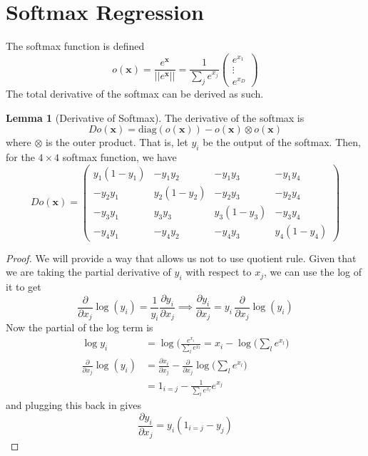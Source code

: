 \documentclass{article}
\theoremstyle{definition}
\newtheorem{lemma}[theorem]{Lemma}
\begin{document}
  \section{Softmax Regression}

  The softmax function is defined 
  \[o(\mathbf{x}) = \frac{e^{\mathbf{x}}}{||e^{\mathbf{x}}||} = \frac{1}{\sum_j e^{x_j}}\begin{pmatrix} e^{x_1} \\ \vdots \\ e^{x_D} \end{pmatrix}\]
  The total derivative of the softmax can be derived as such. 

  \begin{lemma}[Derivative of Softmax]
  The derivative of the softmax is 
  \[D o (\mathbf{x}) = \mathrm{diag}(o (\mathbf{x})) - o (\mathbf{x}) \otimes o (\mathbf{x})\]
  where $\otimes$ is the outer product. That is, let $y_i$ be the output of the softmax. Then, for the $4 \times 4$ softmax function, we have 
  \[D o(\mathbf{x}) = \begin{pmatrix} y_1 (1 - y_1) & - y_1 y_2 & -y_1 y_3 & - y_1 y_4 \\ -y_2 y_1 & y_2 (1 - y_2) & - y_2 y_3 & - y_2 y_4 \\ -y_3 y_1 & y_3 y_3 & y_3 (1 - y_3) & -y_3 y_4 \\ -y_4 y_1 & -y_4 y_2 & -y_4 y_3 & y_4 (1 - y_4) \end{pmatrix} \]
  \end{lemma}
  \begin{proof}
  We will provide a way that allows us not to use quotient rule. Given that we are taking the partial derivative of $y_i$ with respect to $x_j$, we can use the log of it to get 
  \[\frac{\partial}{\partial x_j} \log (y_i) = \frac{1}{y_i} \frac{\partial y_i}{\partial x_j} \implies \frac{\partial y_i}{\partial x_j} = y_i \, \frac{\partial}{\partial x_j} \log(y_i)\]
  Now the partial of the log term is 
  \begin{align*}
      \log{y_i} & = \log \bigg( \frac{e^{x_i}}{\sum_l e^{x_l}} = x_i - \log \bigg( \sum_l e^{x_l}\bigg) \\
      \frac{\partial}{\partial x_j} \log(y_i) & = \frac{\partial x_i}{\partial x_j} - \frac{\partial}{\partial x_j} \log \bigg( \sum_l e^{x_l}\bigg) \\
      & = 1_{i = j} - \frac{1}{\sum_l e^{x_l}} e^{x_j}
  \end{align*}
  and plugging this back in gives 
  \[\frac{\partial y_i}{\partial x_j} = y_i (1_{i = j} - y_j)\]
  \end{proof}
\end{document}
